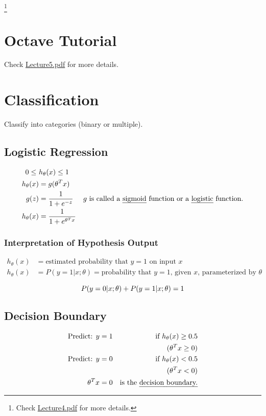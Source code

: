 \documentclass[a4paper, 12pt]{report}
\newcommand\blfootnote[1]{
	\begingroup
	\renewcommand\thefootnote{}\footnote{#1}
	\addtocounter{footnote}{-1}
	\endgroup
}
\begin{document}
\blfootnote{Check \href{lecture_pdf/Lecture4.pdf}{Lecture4.pdf} for more details.}

\chapter{Octave Tutorial}
Check \href{lecture_pdf/Lecture5.pdf}{Lecture5.pdf} for more details.

\chapter{Classification}
Classify into categories (binary or multiple).

\section{Logistic Regression}
\begin{align*}
	0 \le\      & h_\theta(x) \le 1                                               \\
	h_\theta(x) & = g(\theta^Tx)                                                  \\
	g(z)        & = \frac{1}{1 + e^{-z}}        &
	\text{$g$ is called a \emph{sigmoid} function or a \emph{logistic} function.} \\
	h_\theta(x) & = \frac{1}{1 + e^{\theta^Tx}}                                   \\
\end{align*}

\subsection*{Interpretation of Hypothesis Output}
\begin{align*}
	h_\theta(x) & = \text{estimated probability that $y = 1$ on input $x$} \\
	h_\theta(x) & = P(y = 1 | x; \theta) =
	\text{probability that $y = 1$, given $x$, parameterized by $\theta$}  \\
\end{align*}
\begin{equation*}
	P(y = 0 | x; \theta) + P(y = 1 | x; \theta) = 1                  \\
\end{equation*}

\section{Decision Boundary}
\begin{align*}
	\text{Predict: } y & = 1 & \text{ if } h_\theta(x) \ge 0.5         \\
	                   &     & (\theta^Tx \ge 0)                       \\
	\text{Predict: } y & = 0 & \text{ if } h_\theta(x) < 0.5           \\
	                   &     & (\theta^Tx < 0)                         \\
	\theta^Tx          & = 0 & \text{is the \emph{decision boundary.}} \\
\end{align*}
\end{document}
